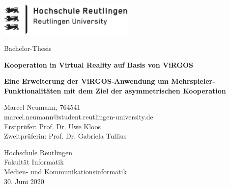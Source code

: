 \begin{titlepage}
	\centering
	\includegraphics[width=0.5\textwidth]{LogoReutlingen.png}\par\vspace{1cm}
	\vspace{0.5cm}
	{\Large Bachelor-Thesis\par}
	\vspace{1.5cm}
	{\huge\bfseries Kooperation in Virtual Reality auf Basis von ViRGOS\par}
	\vspace{2cm}
	{\Large\bfseries Eine Erweiterung der ViRGOS-Anwendung um Mehrspieler-Funktionalitäten mit dem Ziel der asymmetrischen Kooperation \par}
	\vspace{2cm}
	{Marcel Neumann, 764541 \\ marcel.neumann@student.reutlingen-university.de\\
	\vspace{1cm}
	Erstprüfer: Prof. Dr. Uwe Kloos\\
	Zweitprüferin: Prof. Dr. Gabriela Tullius\\
	\vspace{0.2cm}
	\par}
	\vfill
{\large 
Hochschule Reutlingen\\
Fakultät Informatik\\
Medien- und Kommunikationsinformatik\\
\vspace{1cm}
30. Juni 2020}
\end{titlepage}
